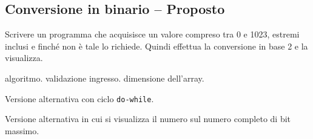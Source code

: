 
\prosep{}

\subsection{Conversione in binario -- Proposto}
Scrivere un programma che acquisisce un valore compreso tra 0 e 1023, estremi inclusi e finch\'e non \`e tale lo richiede. Quindi effettua la conversione in base 2 e la visualizza.

\begin{tags}
algoritmo. validazione ingresso. dimensione dell'array.
\end{tags}


Versione alternativa con ciclo \texttt{do-while}.


Versione alternativa in cui si visualizza il numero sul numero completo di bit massimo.



